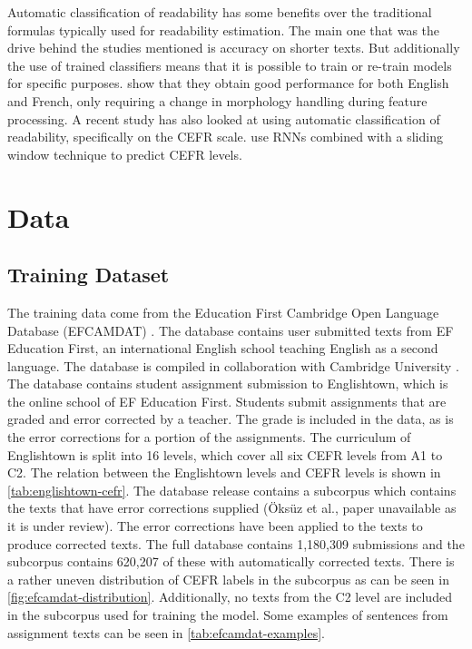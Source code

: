 \documentclass[11pt,a4paper]{article}
\begin{document}
Automatic classification of readability has some benefits over the traditional
formulas typically used for readability estimation. The main one that was the
drive behind the studies mentioned is accuracy on shorter texts. But
additionally the use of trained classifiers means that it is possible to train
or re-train models for specific purposes.
\parencite{collins-thompson-callan-2004-language} show that they obtain good
performance for both English and French, only requiring a change in morphology
handling during feature processing. A recent study has also looked at using
automatic classification of readability, specifically on the CEFR scale.
\parencite{kerz-etal-2021-automated} use RNNs combined with a sliding window
technique to predict CEFR levels.

\section{Data}

\subsection{Training Dataset}

The training data come from the Education First Cambridge Open Language
Database (EFCAMDAT) \parencite{inbook}. The database
contains user submitted texts from EF Education First, an international English school teaching English as a second language. The database is compiled
in collaboration with Cambridge University \parencite{hgbka17}. The database
contains student assignment submission to Englishtown, which is the online
school of EF Education First. Students submit assignments that are graded and
error corrected by a teacher. The grade is included in the data, as is the
error corrections for a portion of the assignments. The curriculum of
Englishtown is split into 16 levels, which cover all six CEFR levels from A1
to C2. The relation between the Englishtown levels and CEFR levels is shown in
\autoref{tab:englishtown-cefr}. The database release contains a subcorpus which contains the texts that
have error corrections supplied (Öksüz et al., paper unavailable as it is under
review). The error corrections have been applied to the texts to produce
corrected texts. The full database contains 1,180,309 submissions and the
subcorpus contains 620,207 of these with automatically corrected texts. There
is a rather uneven distribution of CEFR labels in the subcorpus as can be seen
in \autoref{fig:efcamdat-distribution}. Additionally, no texts from the C2 level
are included in the subcorpus used for training the model. Some examples of
sentences from assignment texts can be seen in \autoref{tab:efcamdat-examples}.
\end{document}
